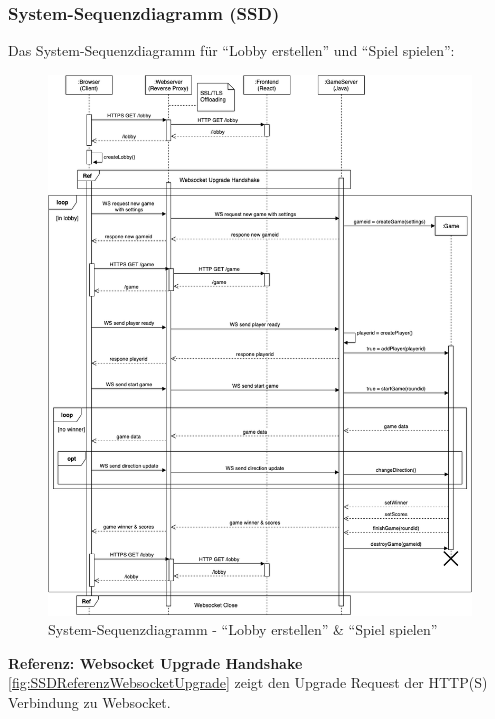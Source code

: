 \documentclass[11pt,ngerman]{article}
\newcommand{\quotes}[1]{``#1''}
\begin{document}
            \subsubsection{System-Sequenzdiagramm (SSD)}
                 Das System-Sequenzdiagramm für \quotes{Lobby erstellen} und \quotes{Spiel spielen}:
                 \begin{figure}[H]
                     \includegraphics[scale=0.5]{figures/SystemSequenceDiagram.png}
                     \caption{System-Sequenzdiagramm - \quotes{Lobby erstellen} \&  \quotes{Spiel spielen}}
                 \end{figure}
                 \newpage
                \noindent \textbf{Referenz: \Gls{Websocket} Upgrade Handshake} \\
                \autoref{fig:SSDReferenzWebsocketUpgrade} zeigt den Upgrade Request der HTTP(S) Verbindung  zu \Gls{Websocket}.
\end{document}
